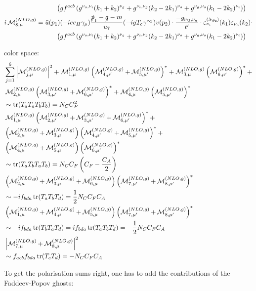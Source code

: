 \begin{align}
 &\hspace{30pt}\left(gf^{acb}\left(g^{\nu_o,\nu_i}(k_1+k_2)^{\nu_g}+g^{\nu_i,\nu_g}(k_2-2k_1)^{\nu_o}+g^{\nu_g,\nu_o}(k_1-2k_2)^{\nu_i}\right)\right)\\
i\Md^{(NLO,g)}_{8,\mu} &= \bar u(p_1)(-i e e_H \gamma_\mu)\frac{\slashed{p}_1-\slashed{q}-m}{u_7}(-igT_c\gamma^{\nu_Q})v(p_2)\cdot\frac{-g_{\nu_Q,\nu_g}}{t'}\cdot\varepsilon^{(\lambda_{\Pg})}_{\nu_i}(k_1)\varepsilon_{\nu_o}(k_2)\cdot\nonumber\\
 &\hspace{30pt}\left(gf^{acb}\left(g^{\nu_o,\nu_i}(k_1+k_2)^{\nu_g}+g^{\nu_i,\nu_g}(k_2-2k_1)^{\nu_o}+g^{\nu_g,\nu_o}(k_1-2k_2)^{\nu_i}\right)\right)
\end{align}

color space:
\begin{align}
&\sum\limits_{j=1}^6\left|\operatorname{\mathcal M}^{(NLO,g)}_{j,\mu}\right|^2 + \operatorname{\mathcal M}^{(NLO,g)}_{1,\mu}\left(\operatorname{\mathcal M}^{(NLO,g)}_{4,\mu'}+\operatorname{\mathcal M}^{(NLO,g)}_{5,\mu'}\right)^*+\operatorname{\mathcal M}^{(NLO,g)}_{3,\mu}\left(\operatorname{\mathcal M}^{(NLO,g)}_{6,\mu'}\right)^*+\nonumber\\
&\operatorname{\mathcal M}^{(NLO,g)}_{2,\mu}\left(\operatorname{\mathcal M}^{(NLO,g)}_{3,\mu'}+\operatorname{\mathcal M}^{(NLO,g)}_{6,\mu'}\right)^*+\operatorname{\mathcal M}^{(NLO,g)}_{4,\mu}\left(\operatorname{\mathcal M}^{(NLO,g)}_{5,\mu'}\right)^*\nonumber\\
&\sim\operatorname{\text{tr}}(T_aT_aT_bT_b) = N_C C_F^2\\
&\operatorname{\mathcal M}^{(NLO,g)}_{1,\mu}\left(\operatorname{\mathcal M}^{(NLO,g)}_{2,\mu'}+\operatorname{\mathcal M}^{(NLO,g)}_{3,\mu'}+\operatorname{\mathcal M}^{(NLO,g)}_{6,\mu'}\right)^*+\nonumber\\
&\left(\operatorname{\mathcal M}^{(NLO,g)}_{2,\mu}+\operatorname{\mathcal M}^{(NLO,g)}_{3,\mu}\right)\left(\operatorname{\mathcal M}^{(NLO,g)}_{4,\mu'}+\operatorname{\mathcal M}^{(NLO,g)}_{5,\mu'}\right)^*+\nonumber\\
&\left(\operatorname{\mathcal M}^{(NLO,g)}_{4,\mu}+\operatorname{\mathcal M}^{(NLO,g)}_{5,\mu}\right)\left(\operatorname{\mathcal M}^{(NLO,g)}_{6,\mu'}\right)^*\nonumber\\
&\sim\operatorname{\text{tr}}(T_aT_bT_aT_b) = N_C C_F \left(C_F - \frac{C_A}{2}\right)\\
&\left(\operatorname{\mathcal M}^{(NLO,g)}_{2,\mu}+\operatorname{\mathcal M}^{(NLO,g)}_{3,\mu}+\operatorname{\mathcal M}^{(NLO,g)}_{6,\mu}\right)\left(\operatorname{\mathcal M}^{(NLO,g)}_{7,\mu'}+\operatorname{\mathcal M}^{(NLO,g)}_{8,\mu'}\right)^*\nonumber\\
&\sim-if_{bda}\operatorname{\text{tr}}(T_aT_bT_d) = \frac 1 2 N_C C_F C_A\\
&\left(\operatorname{\mathcal M}^{(NLO,g)}_{1,\mu}+\operatorname{\mathcal M}^{(NLO,g)}_{4,\mu}+\operatorname{\mathcal M}^{(NLO,g)}_{5,\mu}\right)\left(\operatorname{\mathcal M}^{(NLO,g)}_{7,\mu'}+\operatorname{\mathcal M}^{(NLO,g)}_{8,\mu'}\right)^*\nonumber\\
&\sim-if_{bda}\operatorname{\text{tr}}(T_bT_aT_d) = if_{bda}\operatorname{\text{tr}}(T_aT_bT_d)=-\frac 1 2 N_C C_F C_A\\
&\left|\operatorname{\mathcal M}^{(NLO,g)}_{7,\mu}+\operatorname{\mathcal M}^{(NLO,g)}_{8,\mu}\right|^2 \nonumber\\
&\sim f_{acb}f_{bda}\operatorname{\text{tr}}(T_cT_d) = - N_C C_F C_A
\end{align}

To get the polarisation sums right, one has to add the contributions of the Faddeev-Popov ghosts\cite{FADDEEV196729}:
